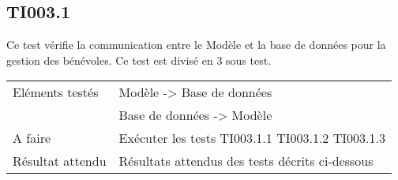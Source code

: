
\subsection{TI003.1}
  		Ce test vérifie la communication entre le Modèle et la base de données pour la gestion des bénévoles. Ce test est divisé en 3 sous test.
  	
 
 	 \begin{center}
    	 	\begin{tabular}[h]{|p{}|p{}|}
		\hline
			Eléments testés & Modèle -> Base de données  \\
						    &  Base de données -> Modèle \\\hline
    			A faire & Exécuter les tests TI003.1.1 TI003.1.2 TI003.1.3 \\\hline
    			Résultat attendu & Résultats attendus des tests décrits ci-dessous \\\hline
     	\end{tabular}
  	\end{center}	
  	

  		



		
  		
  		

  		
  		
